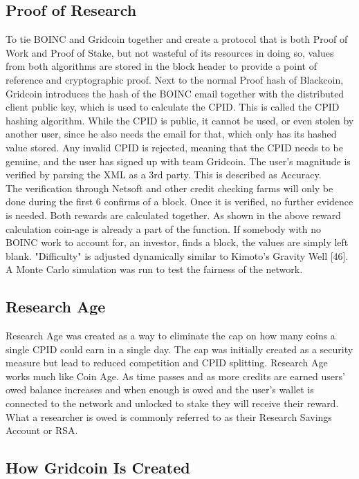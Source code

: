 \subsection{Proof of Research}

To tie BOINC and Gridcoin together and create a protocol that is both Proof of Work and Proof of Stake, but not wasteful of its resources in doing so, values from both algorithms are stored in the block header to provide a point of reference and cryptographic proof. Next to the normal Proof hash of Blackcoin, Gridcoin introduces the hash of the BOINC email together with the distributed client public key, which is used to calculate the CPID. This is called the CPID hashing algorithm. While the CPID is public, it cannot be used, or even stolen by another user, since he also needs the email for that, which only has its hashed value stored. Any invalid CPID is rejected, meaning that the CPID needs to be genuine, and the user has signed up with team Gridcoin. The user's magnitude is verified by parsing the XML as a 3rd party. This is described as Accuracy.\\

The verification through Netsoft and other credit checking farms will only be done during the first 6 confirms of a block. Once it is verified, no further evidence is needed. Both rewards are calculated together. As shown in the above reward calculation coin-age is already a part of the function. If somebody with no BOINC work to account for, an investor, finds a block, the values are simply left blank. "Difficulty" is adjusted dynamically similar to Kimoto's Gravity Well [46]. A Monte Carlo simulation was run to test the fairness of the network.

\subsection{Research Age}

Research Age was created as a way to eliminate the cap on how many coins a single CPID could earn in a single day. The cap was initially created as a security measure but lead to reduced competition and CPID splitting. Research Age works much like Coin Age. As time passes and as more credits are earned users' owed balance increases and when enough is owed and the user's wallet is connected to the network and unlocked to stake they will receive their reward. What a researcher is owed is commonly referred to as their Research Savings Account or RSA.


\subsection{How Gridcoin Is Created}

